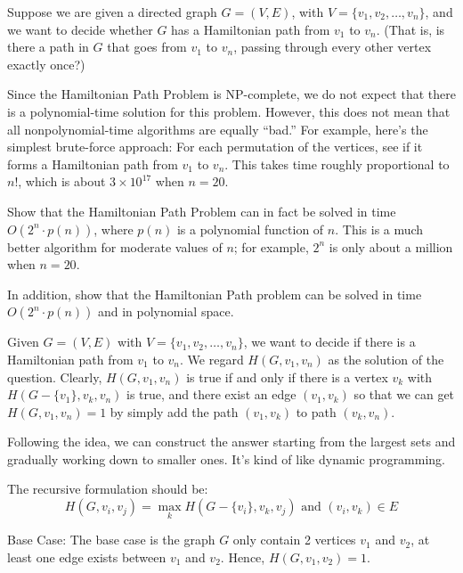 \newpage
{} %

\problemdes

Suppose we are given a directed graph $G = (V,E)$, with $V = \{v_1,v_2, \dots,v_n\}$, and we want to decide whether $G$ has a Hamiltonian path from $v_1$ to $v_n$. (That is, is there a path in $G$ that goes from $v_1$ to $v_n$, passing through every other vertex exactly once?)

Since the Hamiltonian Path Problem is NP-complete, we do not expect that there is a polynomial-time solution for this problem. However, this does not mean that all nonpolynomial-time algorithms are equally “bad.” For example, here’s the simplest brute-force approach: For each permutation of the vertices, see if it forms a Hamiltonian path from $v_1$ to $v_n$. This takes time roughly proportional to $n!$, which is about $3\times10^{17}$ when $n = 20$.

Show that the Hamiltonian Path Problem can in fact be solved in time $O(2^n \cdot p(n))$, where $p(n)$ is a polynomial function of $n$. This is a much better algorithm for moderate values of $n$; for example, $2^n$ is only about a million when $n = 20$.

In addition, show that the Hamiltonian Path problem can be solved in time $O(2^n \cdot p(n))$ and in polynomial space.

\solution


Given $G=(V, E)$ with $V = \{v_1,v_2, \dots,v_n\}$, we want to decide if there is a Hamiltonian path from $v_1$ to $v_n$. We regard $H(G, v_1, v_n)$ as the solution of the question. Clearly, $H(G, v_1, v_n)$ is true if and only if there is a vertex $v_k$ with $H(G-\{v_1\}, v_k, v_n)$ is true, and there exist an edge $(v_1, v_k)$ so that we can get $H(G, v_1, v_n)=1$ by simply add the path $(v_1, v_k)$ to path $(v_k, v_n)$.

Following the idea, we can construct the answer starting from the largest sets and gradually working down to smaller ones. It's kind of like dynamic programming. 

The recursive formulation should be:
$$H(G, v_i, v_j) = \max_{k} H(G-\{v_i\}, v_k, v_j) \text{ and } (v_i, v_k) \in E$$



Base Case: The base case is the graph $G$ only contain 2 vertices $v_1$ and $v_2$, at least one edge exists between $v_1$ and $v_2$. Hence, $H(G, v_1, v_2)=1$.

